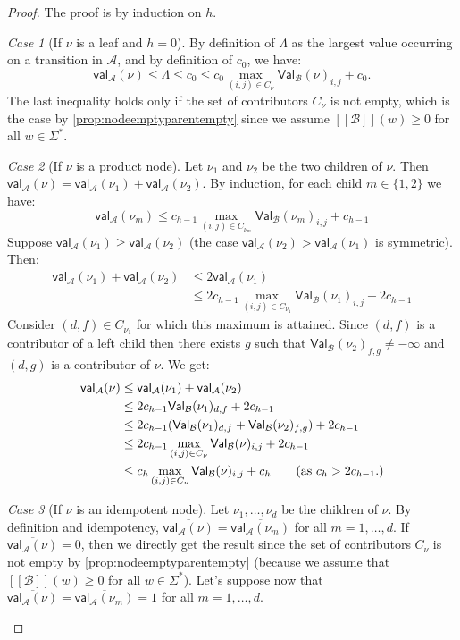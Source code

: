 \documentclass{lmcs}
\theoremstyle{remark}
\newtheorem{case}{Case}
\newcommand{\autA}{\mathcal{A}}
\newcommand{\autB}{\mathcal{B}}
\newcommand{\brfunc}[1]{[\![#1]\!]}
\newcommand{\funcB}{\brfunc{\autB}}
\newcommand{\aval}{\mathsf{val}_\autA}
\newcommand{\bval}{\mathsf{Val}_\autB}
\theoremstyle{remark}
\begin{document}
\begin{proof}
The proof is by induction on $h$.
\begin{case}[If $\nu$ is a leaf and $h=0$]
By definition of $\Lambda$ as the largest value occurring on a transition in $\autA$, and by definition of $c_0$, we have:
 \[\aval(\nu) \le \Lambda \le c_0 \le c_0 \max_{(i,j) \in C_\nu} \bval(\nu)_{i,j} + c_0.\] 
The last inequality holds only if the set of contributors $C_\nu$ is not empty, which is the case by \cref{prop:nodeemptyparentempty} since we assume $\funcB(w) \ge 0$ for all $w\in \Sigma^*$.
\end{case}

\begin{case}[If $\nu$ is a product node]
Let $\nu_1$ and $\nu_2$ be the two children of $\nu$. Then $\aval(\nu) = \aval(\nu_1) + \aval(\nu_2)$. By induction, for each child $m\in\{1,2\}$ we have:
\[ \aval(\nu_m) \leq c_{h-1} \max_{(i,j) \in C_{\nu_m}} \bval(\nu_m)_{i,j} + c_{h-1}\]
Suppose $\aval(\nu_1) \geq  \aval(\nu_2)$ (the case $\aval(\nu_2) >  \aval(\nu_1)$ is symmetric). Then:
\begin{align*}
\aval(\nu_1)+\aval(\nu_2) & \le 2\aval(\nu_1) \\
& \le 2c_{h-1} \max_{(i,j) \in C_{\nu_1}} \bval(\nu_1)_{i,j} + 2c_{h-1}
\end{align*}
Consider $(d,f) \in C_{\nu_1}$ for which this maximum is attained. Since $(d,f)$ is a contributor of a left child then there exists $g$ such that $\bval(\nu_2)_{f,g} \neq -\infty$ and $(d,g)$ is a contributor of $\nu$.
We get:
\begin{align*}
\aval(\nu) &\le \aval(\nu_1) + \aval(\nu_2)
\\&\le 2c_{h-1} \bval(\nu_1)_{d,f} + 2c_{h-1}
\\&\le 2c_{h-1} (\bval(\nu_1)_{d,f} + \bval(\nu_2)_{f,g}) + 2c_{h-1}
\\&\le 2c_{h-1}  \max_{(i,j) \in C_{\nu}} \bval(\nu)_{i,j} + 2c_{h-1}
\\&\le c_h  \max_{(i,j) \in C_{\nu}} \bval(\nu)_{i,j} + c_{h} \tag{as $c_h > 2c_{h-1}$.}
\end{align*}
\end{case}

\begin{case}[If $\nu$ is an idempotent node]
Let $\nu_1,\dots,\nu_d$ be the children of $\nu$. 
By definition and idempotency, $\overline{\aval(\nu)} = \overline{\aval(\nu_m)}$ for all $m=1,\ldots,d$. If $\overline{\aval(\nu)} = 0$, then we directly get the result since the set of contributors $C_\nu$ is not empty by \cref{prop:nodeemptyparentempty} (because we assume that $\funcB(w) \ge 0$ for all $w\in \Sigma^*$). Let's suppose now that $\overline{\aval(\nu)} = \overline{\aval(\nu_m)} = 1$ for all $m=1,\ldots,d$.


\end{case}
\end{proof}
\end{document}
